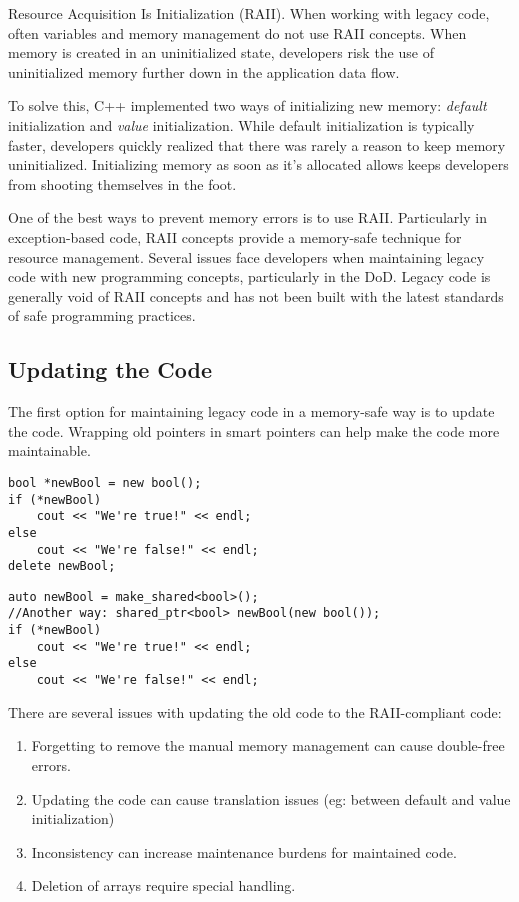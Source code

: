 Resource Acquisition Is Initialization (RAII). When working with legacy code, often variables and memory management do not use RAII concepts. When memory is created in an uninitialized state, developers risk the use of uninitialized memory further down in the application data flow.

To solve this, C++ implemented two ways of initializing new memory: \textit{default} initialization and \textit{value} initialization. While default initialization is typically faster, developers quickly realized that there was rarely a reason to keep memory uninitialized. Initializing memory as soon as it's allocated allows keeps developers from shooting themselves in the foot.

One of the best ways to prevent memory errors is to use RAII. Particularly in exception-based code, RAII concepts provide a memory-safe technique for resource management.\autocite{20210412-stroustrup2001} Several issues face developers when maintaining legacy code with new programming concepts, particularly in the DoD. Legacy code is generally void of RAII concepts and has not been built with the latest standards of safe programming practices.

\subsection{Updating the Code}

The first option for maintaining legacy code in a memory-safe way is to update the code. Wrapping old pointers in smart pointers can help make the code more maintainable.

\begin{lstlisting}[caption={Non-compliant listing},captionpos=b,style=CStyle,basicstyle=\small]
bool *newBool = new bool();
if (*newBool)
	cout << "We're true!" << endl;
else
	cout << "We're false!" << endl;
delete newBool;
\end{lstlisting}

\begin{lstlisting}[caption={RAII-compliant listing},captionpos=b,style=CStyle,basicstyle=\small]
auto newBool = make_shared<bool>();
//Another way: shared_ptr<bool> newBool(new bool());
if (*newBool)
	cout << "We're true!" << endl;
else
	cout << "We're false!" << endl;
\end{lstlisting}

There are several issues with updating the old code to the RAII-compliant code:
\begin{enumerate}
	\item Forgetting to remove the manual memory management can cause double-free errors.
	\item Updating the code can cause translation issues (eg: between default and value initialization)
	\item Inconsistency can increase maintenance burdens for maintained code.
	\item Deletion of arrays require special handling.
\end{enumerate}

